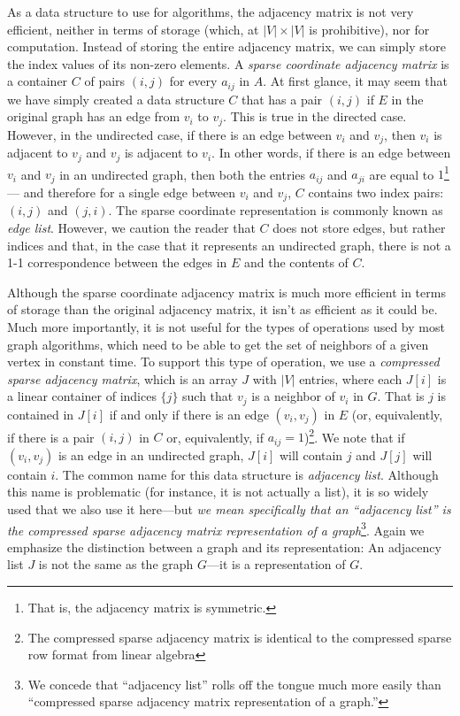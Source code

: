 As a data structure to use for algorithms, the adjacency matrix is not very efficient, neither in terms of storage (which, at $|V|\times |V|$ is prohibitive), nor for computation. Instead of storing the entire
adjacency matrix, we can simply store the index values of its non-zero elements.  A \emph{sparse coordinate adjacency
matrix} is a container $C$ of pairs $(i, j)$ for every $a_{ij}$ in $A$.
%
At first glance, it may seem that we have simply created a data structure $C$ that has a pair $(i,j)$ if $E$ in the
original graph has an edge from $v_i$ to $v_j$.  This is true in the directed case.  However, in the undirected case, if there is an edge between $v_i$ and $v_j$, then $v_i$ is adjacent to $v_j$ and $v_j$ is adjacent to $v_i$.  In other words, if there is an edge between $v_i$ and  $v_j$ in an undirected graph, then both the entries $a_{ij}$ and $a_{ji}$ are equal to $1$\footnote{That is, the adjacency matrix is symmetric.} --- and therefore for a single edge between $v_i$ and $v_j$,  $C$ contains two index pairs: $(i, j)$  and $(j, i)$.   The sparse coordinate representation is commonly known as \emph{edge list}.  However, we caution the reader that $C$ does not store edges, but rather indices and that, in the case that it represents an undirected graph, there is not a 1-1 correspondence between the edges in $E$ and the contents of $C$.

Although the sparse coordinate adjacency matrix is much more efficient in terms of storage than the original adjacency matrix, it isn't as efficient as it could be.  
Much more importantly, it is not useful for the types of operations used by most graph algorithms, which need to be able to get the set of neighbors of a given vertex in constant time.  
To support this type of operation, we use a \emph{compressed sparse adjacency matrix}, which is an array $J$ with $|V|$ entries, where each $J[i]$ is a linear container of indices $\{ j \}$ such that $v_j$ is a neighbor of $v_i$ in $G$.  
That is $j$ is contained in $J[i]$ if and only if there is an edge $(v_i, v_j)$ in $E$ (or, equivalently, if there is a pair $(i, j)$ in $C$ or, equivalently, if $a_{ij} = 1$)\footnote{The compressed sparse adjacency matrix is identical to the compressed sparse row format from linear algebra}.  
We note that if $(v_i, v_j)$ is an edge in an undirected graph, $J[i]$ will contain $j$ and $J[j]$ will contain $i$. 
The common name for this data structure is \emph{adjacency list}.  
Although this name is problematic (for instance, it is not actually a list),  it is so widely used that we also use it here---but \emph{we mean specifically that an  ``adjacency list'' is the compressed sparse adjacency matrix representation of a graph}\footnote{We concede that ``adjacency list'' rolls off the tongue much more easily than ``compressed sparse adjacency matrix representation of a graph.''}.  
Again we emphasize the distinction between a graph and its representation:  An adjacency list $J$ is not the same as the graph $G$---it is a representation of $G$.


